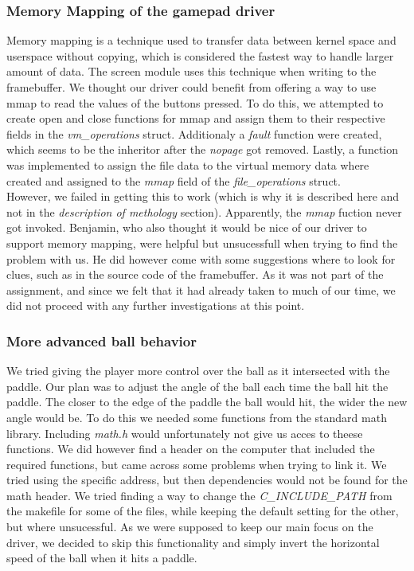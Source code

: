 \subsubsection{Memory Mapping of the gamepad driver}
Memory mapping is a technique used to transfer data between kernel space and userspace without copying, which is considered the fastest way to handle larger amount of data. The screen module uses this technique when writing to the framebuffer. We thought our driver could benefit from offering a way to use mmap to read the values of the buttons pressed. To do this, we attempted to create open and close functions for mmap and assign them to their respective fields in the \emph{vm\_operations} struct. Additionaly a \emph{fault} function were created, which seems to be the inheritor after the \emph{nopage} got removed. Lastly, a function was implemented to assign the file data to the virtual memory data where created and assigned to the \emph{mmap} field of the \emph{file\_operations} struct. \\

However, we failed in getting this to work (which is why it is described here and not in the \emph{description of methology} section). Apparently, the \emph{mmap} fuction never got invoked. Benjamin, who also thought it would be nice of our driver to support memory mapping, were helpful but unsucessfull when trying to find the problem with us. He did however come with some suggestions where to look for clues, such as in the source code of the framebuffer. As it was not part of the assignment, and since we felt that it had already taken to much of our time, we did not proceed with any further investigations at this point.

\subsubsection{More advanced ball behavior} We tried giving the player more control over the ball as it intersected with the paddle. Our plan was to adjust the angle of the ball each time the ball hit the paddle. The closer to the edge of the paddle the ball would hit, the wider the new angle would be. To do this we needed some functions from the standard math library. Including \emph{math.h} would unfortunately not give us acces to theese functions. We did however find a header on the computer that included the required functions, but came across some problems when trying to link it. We tried using the specific address, but then dependencies would not be found for the math header. We tried finding a way to change the \emph{C\_INCLUDE\_PATH} from the makefile for some of the files, while keeping the default setting for the other, but where unsucessful. As we were supposed to keep our main focus on the driver, we decided to skip this functionality and simply invert the horizontal speed of the ball when it hits a paddle. 
